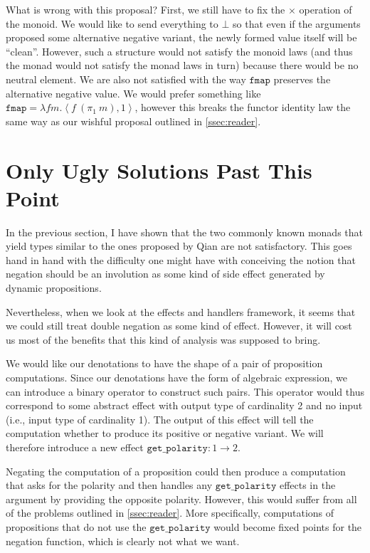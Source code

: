 \documentclass[a4paper,11pt,DIV=12]{scrartcl}
\begin{document}
What is wrong with this proposal? First, we still have to fix the $\times$
operation of the monoid. We would like to send everything to $\bot$ so that
even if the arguments proposed some alternative negative variant, the newly
formed value itself will be ``clean''. However, such a structure would not
satisfy the monoid laws (and thus the monad would not satisfy the monad
laws in turn) because there would be no neutral element. We are also not
satisfied with the way $\texttt{fmap}$ preserves the alternative negative
value. We would prefer something like $\texttt{fmap} = \lambda f m. \left<
f\ (\pi_1\ m), 1 \right>$, however this breaks the functor identity law the
same way as our wishful proposal outlined in \ref{ssec:reader}.

\section{Only Ugly Solutions Past This Point}

In the previous section, I have shown that the two commonly known monads
that yield types similar to the ones proposed by Qian are not
satisfactory. This goes hand in hand with the difficulty one might have
with conceiving the notion that negation should be an involution as some
kind of side effect generated by dynamic propositions.

Nevertheless, when we look at the effects and handlers framework, it seems
that we could still treat double negation as some kind of effect. However,
it will cost us most of the benefits that this kind of analysis was
supposed to bring.

We would like our denotations to have the shape of a pair of proposition
computations. Since our denotations have the form of algebraic expression,
we can introduce a binary operator to construct such pairs. This operator
would thus correspond to some abstract effect with output type of
cardinality 2 and no input (i.e., input type of cardinality 1). The output
of this effect will tell the computation whether to produce its positive or
negative variant. We will therefore introduce a new effect
$\texttt{get\_polarity} : 1 \to 2$.

Negating the computation of a proposition could then produce a computation
that asks for the polarity and then handles any $\texttt{get\_polarity}$
effects in the argument by providing the opposite polarity. However, this
would suffer from all of the problems outlined in \ref{ssec:reader}. More
specifically, computations of propositions that do not use the
$\texttt{get\_polarity}$ would become fixed points for the negation
function, which is clearly not what we want.
\end{document}
